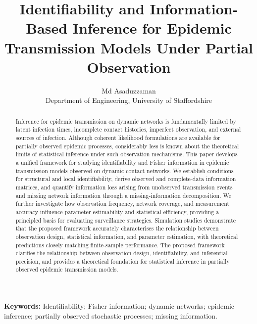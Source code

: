 \documentclass[10pt]{article}
\title{ \null\vspace{-3cm} \textsf{Identifiability and Information-Based Inference for Epidemic Transmission Models Under Partial Observation}}
\author{Md Asaduzzaman\\Department of Engineering, University of Staffordshire}
\date{}
\begin{document}
\maketitle

\begin{abstract}
Inference for epidemic transmission on dynamic networks is fundamentally limited by latent infection times, incomplete contact histories, imperfect observation, and external sources of infection. Although coherent likelihood formulations are available for partially observed epidemic processes, considerably less is known about the theoretical limits of statistical inference under such observation mechanisms. This paper develops a unified framework for studying identifiability and Fisher information in epidemic transmission models observed on dynamic contact networks. We establish conditions for structural and local identifiability, derive observed and complete-data information matrices, and quantify information loss arising from unobserved transmission events and missing network information through a missing-information decomposition. We further investigate how observation frequency, network coverage, and measurement accuracy influence parameter estimability and statistical efficiency, providing a principled basis for evaluating surveillance strategies. Simulation studies demonstrate that the proposed framework accurately characterises the relationship between observation design, statistical information, and parameter estimation, with theoretical predictions closely matching finite-sample performance. The proposed framework clarifies the relationship between observation design, identifiability, and inferential precision, and provides a theoretical foundation for statistical inference in partially observed epidemic transmission models.
\end{abstract}

\noindent\textbf{Keywords:} Identifiability; Fisher information; dynamic networks; epidemic inference; partially observed stochastic processes; missing information.

\linespread{1}
\end{document}
